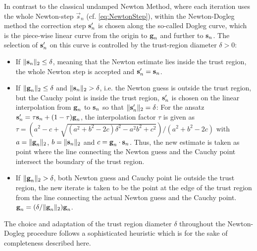 In contrast to the classical undamped Newton Method, where each iteration uses the whole Newton-step $\vec{s}_n$ (cf. \cref{eq:NewtonStep}), within the Newton-Dogleg method the correction step  $\textbf{s}'_n$ is chosen along the so-called Dogleg curve, which is the piece-wise linear
curve from the origin to $\textbf{g}_n$ and further to $ \textbf{s}_n$. The selection of $\textbf{s}'_n$ on this curve is controlled by the trust-region diameter $\delta > 0$:
\begin{itemize}
	\item
	If $\|  \textbf{s}_n \|_2 \leq \delta$,  meaning that the Newton estimate lies inside the trust region, the whole Newton step is accepted and $ \textbf{s}'_n =  \textbf{s}_n$.	
	\item
	If  $\|  \textbf{g}_n \|_2 \leq \delta$ and $\|  \textbf{s}_n \|_2 > \delta$, i.e. the Newton guess is outside the trust region, but the Cauchy point is inside the trust region, 
	$\textbf{s}'_n$ is chosen on the linear interpolation from $\textbf{g}_n$ to $\textbf{s}_n$
	so that  $\|  \textbf{s}'_n \|_2 = \delta$:
	For the ansatz
	$\textbf{s}'_n = \tau \textbf{s}_n + (1-\tau) \textbf{g}_n$,
	the interpolation factor $\tau$ is given as
	$ \tau = (a^2 - c + \sqrt{(a^2 + b^2 - 2 c) \delta^2 - a^2 b^2 + c^2}) / (a^2 + b^2 - 2 c) $
	with $a = \| \textbf{g}_n \|_2$,  $b = \| \textbf{s}_n \|_2$ and $c = \textbf{g}_n \cdot \textbf{s}_n $. Thus, the new estimate is taken as point where the line connecting the Newton guess and the Cauchy point intersect the boundary of the trust region.
	
	\item 	If  $\|  \textbf{g}_n \|_2 > \delta$, both Newton guess and Cauchy point lie outside the trust region, the new iterate is taken to be the point  at  the edge of the trust region from the line connecting the actual Newton guess and the Cauchy point.
	$  \textbf{g}_n = (\delta / \|  \textbf{g}_n \|_2) \textbf{g}_n$.
\end{itemize}
The choice and adaptation of the trust region diameter $\delta$ throughout the Newton-Dogleg procedure follows a sophisticated heuristic which is for the sake of completeness described here. 

